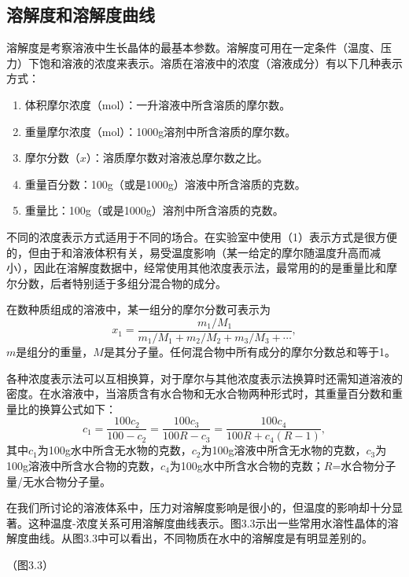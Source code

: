﻿\subsection{溶解度和溶解度曲线}
溶解度是考察溶液中生长晶体的最基本参数。溶解度可用在一定条件（温度、压力）下饱和溶液的浓度来表示。溶质在溶液中的浓度（溶液成分）有以下几种表示方式：

\begin{enumerate}[(1)]
\item 体积摩尔浓度（mol）：一升溶液中所含溶质的摩尔数。
\item 重量摩尔浓度（mol）：1000g溶剂中所含溶质的摩尔数。
\item 摩尔分数（$x$）：溶质摩尔数对溶液总摩尔数之比。
\item 重量百分数：100g（或是1000g）溶液中所含溶质的克数。
\item 重量比：100g（或是1000g）溶剂中所含溶质的克数。
\end{enumerate}

不同的浓度表示方式适用于不同的场合。在实验室中使用（1）表示方式是很方便的，但由于和溶液体积有关，易受温度影响（某一给定的摩尔随温度升高而减小），因此在溶解度数据中，经常使用其他浓度表示法，最常用的的是重量比和摩尔分数，后者特别适于多组分混合物的成分。

在数种质组成的溶液中，某一组分的摩尔分数可表示为
\begin{equation}
x_1=\frac{m_1/M_1}{m_1/M_1+m_2/M_2+m_3/M_3+\cdots},
\end{equation}
$m$是组分的重量，$M$是其分子量。任何混合物中所有成分的摩尔分数总和等于1。

各种浓度表示法可以互相换算，对于摩尔与其他浓度表示法换算时还需知道溶液的密度。在水溶液中，当溶质含有水合物和无水合物两种形式时，其重量百分数和重量比的换算公式如下：
\begin{equation}
c_1=\frac{100c_2}{100-c_2}=\frac{100c_3}{100R-c_3}=\frac{100c_4}{100R+c_4(R-1)},
\end{equation}
其中$c_1$为100g水中所含无水物的克数，$c_2$为100g溶液中所含无水物的克数，$c_3$为100g溶液中所含水合物的克数，$c_4$为100g水中所含水合物的克数；$R$=水合物分子量/无水合物分子量。

在我们所讨论的溶液体系中，压力对溶解度影响是很小的，但温度的影响却十分显著。这种温度-浓度关系可用溶解度曲线表示。图3.3示出一些常用水溶性晶体的溶解度曲线。从图3.3中可以看出，不同物质在水中的溶解度是有明显差别的。

（图3.3）

